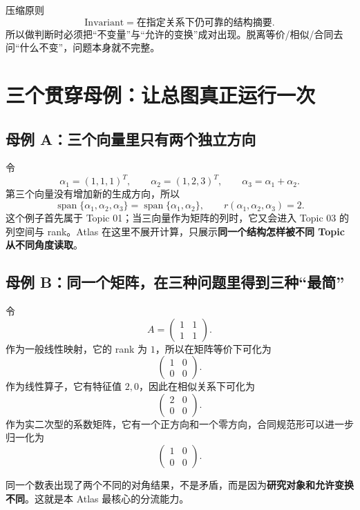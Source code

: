 \documentclass[11pt,a4paper]{ctexart}
\newcommand{\kw}[1]{\textbf{\color{deep}#1}}
\begin{document}
\begin{corebox}{压缩原则}
\[
\boxed{\text{Invariant}=\text{在指定关系下仍可靠的结构摘要}.}
\]
所以做判断时必须把“不变量”与“允许的变换”成对出现。脱离等价/相似/合同去问“什么不变”，问题本身就不完整。
\end{corebox}

\section{三个贯穿母例：让总图真正运行一次}

\subsection{母例 A：三个向量里只有两个独立方向}

令
\[
\alpha_1=(1,1,1)^T,\qquad
\alpha_2=(1,2,3)^T,\qquad
\alpha_3=\alpha_1+\alpha_2.
\]
第三个向量没有增加新的生成方向，所以
\[
\operatorname{span}\{\alpha_1,\alpha_2,\alpha_3\}
=\operatorname{span}\{\alpha_1,\alpha_2\},
\qquad r(\alpha_1,\alpha_2,\alpha_3)=2.
\]
这个例子首先属于 Topic 01；当三向量作为矩阵的列时，它又会进入 Topic 03 的列空间与 rank。Atlas 在这里不展开计算，只展示\kw{同一个结构怎样被不同 Topic 从不同角度读取}。

\subsection{母例 B：同一个矩阵，在三种问题里得到三种“最简”}

令
\[
A=\begin{pmatrix}1&1\\1&1\end{pmatrix}.
\]
作为一般线性映射，它的 rank 为 $1$，所以在矩阵等价下可化为
\[
\begin{pmatrix}1&0\\0&0\end{pmatrix}.
\]
作为线性算子，它有特征值 $2,0$，因此在相似关系下可化为
\[
\begin{pmatrix}2&0\\0&0\end{pmatrix}.
\]
作为实二次型的系数矩阵，它有一个正方向和一个零方向，合同规范形可以进一步归一化为
\[
\begin{pmatrix}1&0\\0&0\end{pmatrix}.
\]

同一个数表出现了两个不同的对角结果，不是矛盾，而是因为\kw{研究对象和允许变换不同}。这就是本 Atlas 最核心的分流能力。
\end{document}
